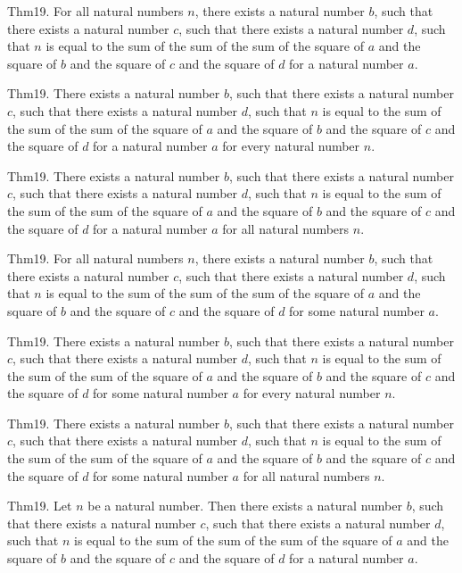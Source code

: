 \documentclass{article}
\begin{document}
Thm19. For all natural numbers $n$, there exists a natural number $b$, such that there exists a natural number $c$, such that there exists a natural number $d$, such that $n$ is equal to the sum of the sum of the sum of the square of $a$ and the square of $b$ and the square of $c$ and the square of $d$ for a natural number $a$.

Thm19. There exists a natural number $b$, such that there exists a natural number $c$, such that there exists a natural number $d$, such that $n$ is equal to the sum of the sum of the sum of the square of $a$ and the square of $b$ and the square of $c$ and the square of $d$ for a natural number $a$ for every natural number $n$.

Thm19. There exists a natural number $b$, such that there exists a natural number $c$, such that there exists a natural number $d$, such that $n$ is equal to the sum of the sum of the sum of the square of $a$ and the square of $b$ and the square of $c$ and the square of $d$ for a natural number $a$ for all natural numbers $n$.

Thm19. For all natural numbers $n$, there exists a natural number $b$, such that there exists a natural number $c$, such that there exists a natural number $d$, such that $n$ is equal to the sum of the sum of the sum of the square of $a$ and the square of $b$ and the square of $c$ and the square of $d$ for some natural number $a$.

Thm19. There exists a natural number $b$, such that there exists a natural number $c$, such that there exists a natural number $d$, such that $n$ is equal to the sum of the sum of the sum of the square of $a$ and the square of $b$ and the square of $c$ and the square of $d$ for some natural number $a$ for every natural number $n$.

Thm19. There exists a natural number $b$, such that there exists a natural number $c$, such that there exists a natural number $d$, such that $n$ is equal to the sum of the sum of the sum of the square of $a$ and the square of $b$ and the square of $c$ and the square of $d$ for some natural number $a$ for all natural numbers $n$.

Thm19. Let $n$ be a natural number. Then there exists a natural number $b$, such that there exists a natural number $c$, such that there exists a natural number $d$, such that $n$ is equal to the sum of the sum of the sum of the square of $a$ and the square of $b$ and the square of $c$ and the square of $d$ for a natural number $a$.
\end{document}
